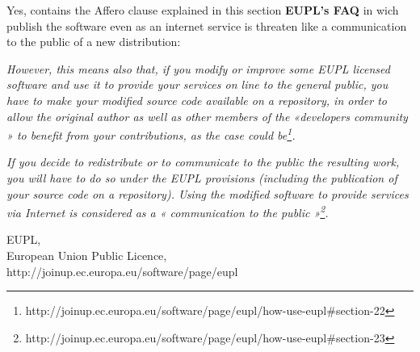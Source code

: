 \documentclass[11pt]{scrartcl}
\begin{document}
\begin{enumerate}
		Yes, contains the Affero clause explained in this section \textbf{EUPL's FAQ} in wich publish the software even as an internet service is threaten like a communication to the public of a new distribution:
		
		\emph{However, this means also that, if you modify or improve some EUPL licensed software and use it to provide your services on line to the general public, you have to make your modified source code available on a repository, in order to allow the original author as well as other members of the «developers community » to benefit from your contributions, as the case could be\footnote{http://joinup.ec.europa.eu/software/page/eupl/how-use-eupl\#section-22}.}

		\emph{If you decide to redistribute or to communicate to the public the resulting work, you will have to do so under the EUPL provisions (including the publication of your source code on a repository). Using the modified software to provide services via Internet is considered as a « communication to the public »\footnote{http://joinup.ec.europa.eu/software/page/eupl/how-use-eupl\#section-23}.}
	
\end{enumerate}

\begin{thebibliography}{9}

		EUPL,\\
		European Union Public Licence,\\
		http://joinup.ec.europa.eu/software/page/eupl
		
\end{thebibliography}
\end{document}
